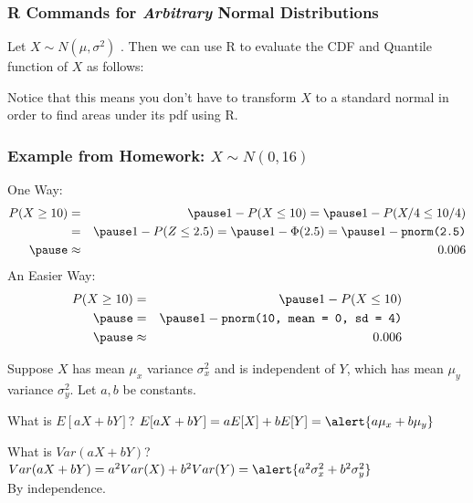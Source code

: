 \documentclass[handout]{beamer}
\begin{document}
\begin{frame}
\frametitle{R Commands for \emph{Arbitrary} Normal Distributions}
Let $X \sim N(\mu, \sigma^2)$ . Then we can use R to evaluate the CDF and Quantile function of $X$ as follows:
\vspace{1em}
\begin{table}
\centering
{}
\end{table}
\vspace{1em}
\alert{Notice that this means you don't have to transform $X$ to a standard normal in order to find areas under its pdf using R.}
\end{frame}
\begin{frame}
\frametitle{Example from Homework: $X \sim N(0,16)$}

One Way:
			\begin{eqnarray*}
				P(X \geq 10) &=& \pause 1 - P(X \leq 10) = \pause 1 - P(X /4\leq 10/4)\\
				&=& \pause 1 - P(Z\leq 2.5) = \pause  1 - \Phi(2.5) = \pause 1 - \mbox{\texttt{pnorm(2.5)}}\\ \pause
				&\approx& 0.006
			\end{eqnarray*}
\pause
An Easier Way:
	\begin{eqnarray*}
	P(X \geq 10) &=& \pause 1 - P(X \leq 10)\\ \pause
	&=& \pause 1 - \texttt{pnorm(10, mean = 0, sd = 4)} \\ \pause
	&\approx& 0.006
	\end{eqnarray*}
\end{frame}
\begin{frame}
Suppose $X$ has mean $\mu_x$ variance $\sigma_x^2$ and is independent of $Y$, which has mean $\mu_y$ variance $\sigma_y^2$. Let $a,b$ be constants.
\vspace{2em}

\begin{block}{What is $E[aX + bY]$?}
\pause
$E[aX + bY]=a E[X] + b E[Y] = \alert{a\mu_x + b\mu_y}$
\end{block}
\vspace{1em}

\begin{block}{What is $Var(aX + bY)$?}
\pause
$Var(aX + bY) = a^2 Var(X) + b^2 Var(Y) = \alert{a^2 \sigma_x^2 + b^2 \sigma_y^2}$
\\\alert{By independence.}
\end{block}

\end{frame}
\end{document}
